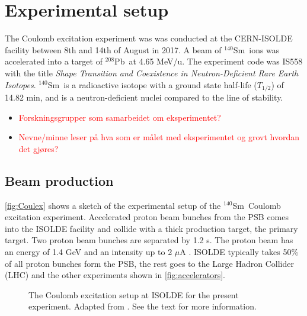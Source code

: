 \documentclass[twoside,english]{uiofysmaster/uiofysmaster}
\newcommand{\Sm}{$^{140}$Sm} %
\newcommand{\Pb}{$^{208}$Pb}
\let\orgautoref\autoref
\renewcommand{\autoref}
        {%
		 \def\sectionautorefname{Section}%
		 \def\subsectionautorefname{Section}%
		 \def\subsubsectionautorefname{Section}%
		 \def\chapterautorefname{Chapter}%
          \orgautoref}
\begin{document}
\section{Experimental setup}\label{sec:exp_setup}
The Coulomb excitation experiment was was conducted at the CERN-ISOLDE facility between 8th and 14th of August in 2017. 
A beam of \Sm\ ions was accelerated into a target of \Pb\ at 4.65 MeV/u.
The experiment code was IS558 with the title \textit{Shape Transition and Coexistence in Neutron-Deficient Rare Earth Isotopes}.
\Sm\ is a radioactive isotope with a ground state half-life ($T_{1/2}$) of 14.82 min, and is a neutron-deficient nuclei compared to the line of stability.


\begin{itemize}
	\item \textcolor{red}{Forskningsgrupper som samarbeidet om eksperimentet?}
	\item \textcolor{red}{Nevne/minne leser på hva som er målet med eksperimentet og grovt hvordan det gjøres?}
\end{itemize}


\subsection{Beam production}\label{ssec:beam_prod}
\autoref{fig:Coulex} shows a sketch of the experimental setup of the \Sm\ Coulomb excitation experiment. 
Accelerated proton beam bunches from the PSB comes into the ISOLDE facility and collide with a thick production target, the primary target. 
Two proton beam bunches are separated by 1.2 s.
The proton beam has an energy of 1.4 GeV and an intensity up to 2 $\mu$A \cite{TIF, TIF2013}. 
ISOLDE typically takes 50\% \cite{MB-spect} of all proton bunches form the PSB, the rest goes to the Large Hadron Collider (LHC) and the other experiments shown in \autoref{fig:accelerators}. 

\begin{figure}[ht]
	\centering
	
	\caption{The Coulomb excitation setup at ISOLDE for the present experiment. 
	Adapted from \cite{Klintefjord}. 
	See the text for more information.}
	\label{fig:Coulex}
\end{figure}
\end{document}
